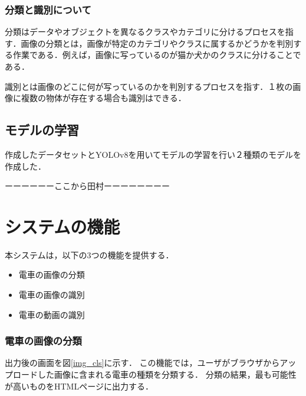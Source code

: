 \begin{multicols*}{2}
\subsubsection{分類と識別について}
分類はデータやオブジェクトを異なるクラスやカテゴリに分けるプロセスを指す．画像の分類とは，画像が特定のカテゴリやクラスに属するかどうかを判別する作業である．例えば，画像に写っているのが猫か犬かのクラスに分けることである．

識別とは画像のどこに何が写っているのかを判別するプロセスを指す．１枚の画像に複数の物体が存在する場合も識別はできる．



\subsection{モデルの学習}
作成したデータセットとYOLOv8を用いてモデルの学習を行い２種類のモデルを作成した．



ーーーーーーここから田村ーーーーーーーー

\section{システムの機能}
本システムは，以下の3つの機能を提供する．
\begin{itemize}
	\item 電車の画像の分類
	\item 電車の画像の識別
	\item 電車の動画の識別
\end{itemize}

\subsubsection{電車の画像の分類} 
出力後の画面を図\ref{img_cls}に示す．
この機能では，ユーザがブラウザからアップロードした画像に含まれる電車の種類を分類する． 分類の結果，最も可能性が高いものをHTMLページに出力する．

\end{multicols*}
